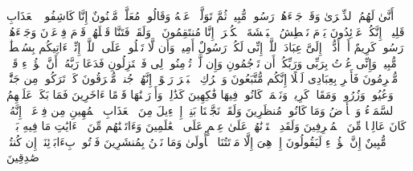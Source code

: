 \stopbuffer
\startbuffer[\q:44:13]
أَنَّىٰ لَهُمُ ٱلذِّكۡرَىٰ وَقَدۡ جَاۤءَهُمۡ رَسُولࣱ مُّبِینࣱ%
\stopbuffer
\startbuffer[\q:44:14]
ثُمَّ تَوَلَّوۡا۟ عَنۡهُ وَقَالُوا۟ مُعَلَّمࣱ مَّجۡنُونٌ%
\stopbuffer
\startbuffer[\q:44:15]
إِنَّا كَاشِفُوا۟ ٱلۡعَذَابِ قَلِیلًاۚ إِنَّكُمۡ عَاۤئِدُونَ%
\stopbuffer
\startbuffer[\q:44:16]
یَوۡمَ نَبۡطِشُ ٱلۡبَطۡشَةَ ٱلۡكُبۡرَىٰۤ إِنَّا مُنتَقِمُونَ%
\stopbuffer
\startbuffer[\q:44:17]
۞ وَلَقَدۡ فَتَنَّا قَبۡلَهُمۡ قَوۡمَ فِرۡعَوۡنَ وَجَاۤءَهُمۡ رَسُولࣱ كَرِیمٌ%
\stopbuffer
\startbuffer[\q:44:18]
أَنۡ أَدُّوۤا۟ إِلَیَّ عِبَادَ ٱللَّهِۖ إِنِّی لَكُمۡ رَسُولٌ أَمِینࣱ%
\stopbuffer
\startbuffer[\q:44:19]
وَأَن لَّا تَعۡلُوا۟ عَلَى ٱللَّهِۖ إِنِّیۤ ءَاتِیكُم بِسُلۡطَٰنࣲ مُّبِینࣲ%
\stopbuffer
\startbuffer[\q:44:20]
وَإِنِّی عُذۡتُ بِرَبِّی وَرَبِّكُمۡ أَن تَرۡجُمُونِ%
\stopbuffer
\startbuffer[\q:44:21]
وَإِن لَّمۡ تُؤۡمِنُوا۟ لِی فَٱعۡتَزِلُونِ%
\stopbuffer
\startbuffer[\q:44:22]
فَدَعَا رَبَّهُۥۤ أَنَّ هَٰۤؤُلَاۤءِ قَوۡمࣱ مُّجۡرِمُونَ%
\stopbuffer
\startbuffer[\q:44:23]
فَأَسۡرِ بِعِبَادِی لَیۡلًا إِنَّكُم مُّتَّبَعُونَ%
\stopbuffer
\startbuffer[\q:44:24]
وَٱتۡرُكِ ٱلۡبَحۡرَ رَهۡوًاۖ إِنَّهُمۡ جُندࣱ مُّغۡرَقُونَ%
\stopbuffer
\startbuffer[\q:44:25]
كَمۡ تَرَكُوا۟ مِن جَنَّٰتࣲ وَعُیُونࣲ%
\stopbuffer
\startbuffer[\q:44:26]
وَزُرُوعࣲ وَمَقَامࣲ كَرِیمࣲ%
\stopbuffer
\startbuffer[\q:44:27]
وَنَعۡمَةࣲ كَانُوا۟ فِیهَا فَٰكِهِینَ%
\stopbuffer
\startbuffer[\q:44:28]
كَذَٰلِكَۖ وَأَوۡرَثۡنَٰهَا قَوۡمًا ءَاخَرِینَ%
\stopbuffer
\startbuffer[\q:44:29]
فَمَا بَكَتۡ عَلَیۡهِمُ ٱلسَّمَاۤءُ وَٱلۡأَرۡضُ وَمَا كَانُوا۟ مُنظَرِینَ%
\stopbuffer
\startbuffer[\q:44:30]
وَلَقَدۡ نَجَّیۡنَا بَنِیۤ إِسۡرَٰۤءِیلَ مِنَ ٱلۡعَذَابِ ٱلۡمُهِینِ%
\stopbuffer
\startbuffer[\q:44:31]
مِن فِرۡعَوۡنَۚ إِنَّهُۥ كَانَ عَالِیࣰا مِّنَ ٱلۡمُسۡرِفِینَ%
\stopbuffer
\startbuffer[\q:44:32]
وَلَقَدِ ٱخۡتَرۡنَٰهُمۡ عَلَىٰ عِلۡمٍ عَلَى ٱلۡعَٰلَمِینَ%
\stopbuffer
\startbuffer[\q:44:33]
وَءَاتَیۡنَٰهُم مِّنَ ٱلۡءَایَٰتِ مَا فِیهِ بَلَٰۤؤࣱا۟ مُّبِینٌ%
\stopbuffer
\startbuffer[\q:44:34]
إِنَّ هَٰۤؤُلَاۤءِ لَیَقُولُونَ%
\stopbuffer
\startbuffer[\q:44:35]
إِنۡ هِیَ إِلَّا مَوۡتَتُنَا ٱلۡأُولَىٰ وَمَا نَحۡنُ بِمُنشَرِینَ%
\stopbuffer
\startbuffer[\q:44:36]
فَأۡتُوا۟ بِءَابَاۤئِنَاۤ إِن كُنتُمۡ صَٰدِقِینَ%
\stopbuffer

